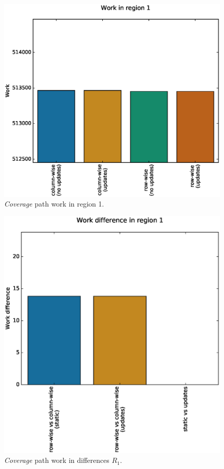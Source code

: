\documentclass{tamuccthesis}
\begin{document}
\begin{figure}
    \captionsetup{justification=centering}
    \centering
    \includegraphics[width=\textwidth,trim={0cm 0cm 0cm 0.75cm},clip]{work_r1.eps}
    \caption{\textit{Coverage} path work in region 1.}
    \label{fig:coverage_noterrain_work_r1}
\end{figure}
\begin{figure}
    \captionsetup{justification=centering}
    \centering
    \includegraphics[width=\textwidth,trim={0cm 0cm 0cm 0.75cm},clip]{diff_r1.eps}
    \caption{\textit{Coverage} path work in differences $R_1$.}
    \label{fig:coverage_noterrain_diff_r1}
\end{figure}
\end{document}

